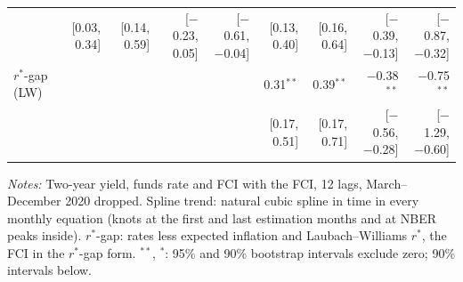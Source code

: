 \begin{table}[tp]
{\begin{tabular}{lrrrrrrrr}
 & {\tiny [0.03, 0.34]} & {\tiny [0.14, 0.59]} & {\tiny [$-$0.23, 0.05]} & {\tiny [$-$0.61, $-$0.04]} & {\tiny [0.13, 0.40]} & {\tiny [0.16, 0.64]} & {\tiny [$-$0.39, $-$0.13]} & {\tiny [$-$0.87, $-$0.32]}\\
$r^*$-gap (LW) & \multicolumn{4}{c}{} & 0.31$^{**}$ & 0.39$^{**}$ & $-$0.38$^{**}$ & $-$0.75$^{**}$\\
 & \multicolumn{4}{c}{} & {\tiny [0.17, 0.51]} & {\tiny [0.17, 0.71]} & {\tiny [$-$0.56, $-$0.28]} & {\tiny [$-$1.29, $-$0.60]}\\
\bottomrule\end{tabular}}
\begin{flushleft}\footnotesize\textit{Notes:} Two-year yield, funds rate and FCI with the FCI, 12 lags, March--December 2020 dropped. Spline trend: natural cubic spline in time in every monthly equation (knots at the first and last estimation months and at NBER peaks inside). $r^*$-gap: rates less expected inflation and Laubach--Williams $r^*$, the FCI in the $r^*$-gap form. $^{**}$, $^{*}$: 95\% and 90\% bootstrap intervals exclude zero; 90\% intervals below.\end{flushleft}
\end{table}

